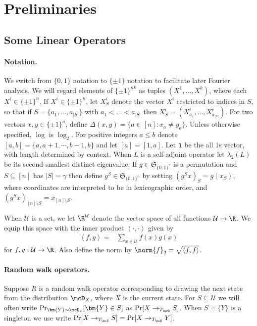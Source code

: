 \section{Preliminaries}

\subsection{Some Linear Operators}
\paragraph{Notation.} We switch from $\{0,1\}$ notation to $\{\pm 1\}$ notation to facilitate later Fourier analysis.
We will regard elements of $\{\pm1\}^{nk}$ as tuples $(X^1,\dots,X^k)$, where each $X^i\in \{\pm1\}^n$. If $X^i \in \{\pm1\}^n$, let $X^i_S$ denote the vector $X^i$ restricted to indices in $S$, so that if $S=\{a_1,\dots,a_{|S|}\}$ with $a_1<\dots<a_{|S|}$ then $X^i_S=(X^i_{a_1},\dots,X^i_{a_{|S|}})$. For two vectors $x,y\in \{\pm1\}^n$, define $\Delta(x,y)=\{a\in[n]: x_a\neq y_a\}$. Unless otherwise specified, $\log$ is $\log_2$. For positive integers $a\leq b$ denote $[a,b]=\{a,a+1,\cdots, b-1,b\}$ and let $[a]=[1,a]$. Let $\mathbf{1}$ be the all 1s vector, with length determined by context. When $L$ is a self-adjoint operator let $\lambda_2(L)$ be its second-smallest distinct eigenvalue. If $g\in\mathfrak{S}_{\{0,1\}^{\gamma}}$ is a permutation and $S\subseteq [n]$ has $|S|=\gamma$ then define $g^S\in\mathfrak{S}_{\{0,1\}^n}$ by setting $(g^Sx)_S=g(x_S)$, where coordinates are interpreted to be in lexicographic order, and $(g^Sx)_{[n]\setminus S}=x_{[n]\setminus S}$.

When $\mathcal U$ is a set, we let $\R^{\mathcal U}$ denote the vector space of all functions $\mathcal U\to \R$. We equip this space with the inner product $\left\langle \cdot,\cdot\right\rangle$ given by
\begin{align*}
    \left\langle f,g\right\rangle =& \sum_{x\in \mathcal U}f(x)g(x)
\end{align*}
for $f,g:\mathcal U\to \R$. Also define the norm by $\norm{f}_2=\sqrt{\left\langle f,f\right\rangle}$.

\paragraph{Random walk operators.} Suppose $R$ is a random walk operator corresponding to drawing the next state from the distribution $\mcD_X$, where $X$ is the current state. For $S\subseteq \mathcal{U}$ we will often write $\Pr_{\bm{Y}\sim \mcD_x}[\bm{Y}\in S]$ as $\Pr[X \to_{T_\mcD} S]$. When $S=\{Y\}$ is a singleton we use write $\Pr[X \to_{T_\mcD} S]=\Pr[X \to_{T_\mcD} Y]$.

